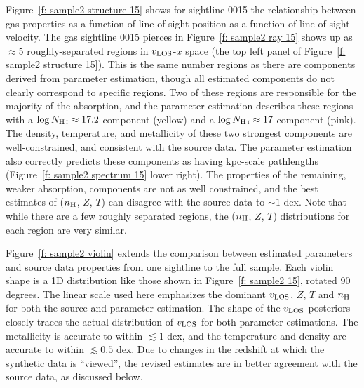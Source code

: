 \documentclass[fleqn,usenatbib]{mnras}
\begin{document}
Figure~\ref{f: sample2 structure 15} shows for sightline 0015 the relationship between gas properties as a function of line-of-sight position as a function of line-of-sight velocity.
The gas sightline 0015 pierces in Figure~\ref{f: sample2 ray 15} shows up as $\approx 5$ roughly-separated regions in $v_{\rm LOS}$-$x$ space (the top left panel of Figure~\ref{f: sample2 structure 15}).
This is the same number regions as there are components derived from parameter estimation,
though all estimated components do not clearly correspond to specific regions.
Two of these regions are responsible for the majority of the  absorption,
and the parameter estimation describes these regions with a $\log N_{\ion{H}{I}} \approx 17.2$ component (yellow) and a $\log N_{\ion{H}{I}} \approx 17$ component (pink).
The density, temperature, and metallicity of these two strongest components are well-constrained, and consistent with the source data.
The parameter estimation also correctly predicts these components as having kpc-scale pathlengths (Figure~\ref{f: sample2 spectrum 15} lower right).
The properties of the remaining, weaker absorption, components are not as well constrained, and the best estimates of ($n_{\rm H}$, $Z$, $T$) can disagree with the source data to $\sim 1$ dex.
Note that while there are a few roughly separated regions, the ($n_{\rm H}$, $Z$, $T$) distributions for each region are very similar.

Figure~\ref{f: sample2 violin} extends the comparison between estimated parameters and source data properties from one sightline to the full sample.
Each violin shape is a 1D distribution like those shown in Figure~\ref{f: sample2 15}, rotated 90 degrees.
The linear scale used here emphasizes the dominant $v_{\rm LOS}$, $Z$, $T$ and $n_{\rm H}$ for both the source and parameter estimation.
The shape of the $v_{\rm LOS}$ posteriors closely traces the actual distribution of $v_{\rm LOS}$ for both parameter estimations.
The metallicity is accurate to within $\lesssim 1$ dex,
and the temperature and density are accurate to within $\lesssim 0.5$ dex.
Due to changes in the redshift at which the synthetic data is ``viewed'', the revised estimates are in better agreement with the source data,
as discussed below.
\end{document}
